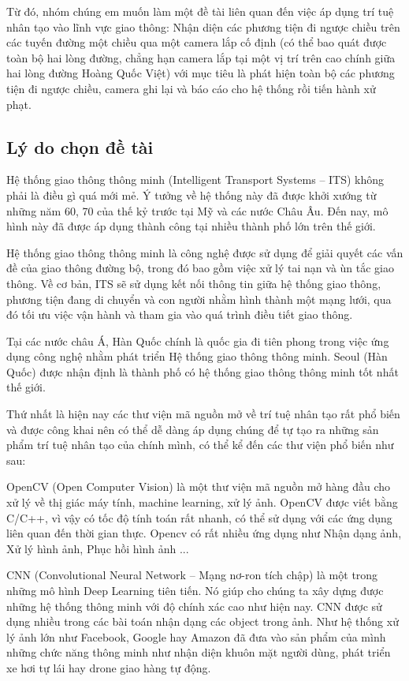 \documentclass[14pt,oneside,a4paper]{extreport}
\begin{document}
Từ đó, nhóm chúng em muốn làm một đề tài liên quan đến việc áp dụng trí tuệ nhân tạo vào lĩnh vực giao thông: Nhận diện các phương tiện đi ngược chiều trên các tuyến đường một chiều qua một camera lắp cố định (có thể bao quát được toàn bộ hai lòng đường, chẳng hạn camera lắp tại một vị trí trên cao chính giữa hai lòng đường Hoàng Quốc Việt) với mục tiêu là phát hiện toàn bộ các phương tiện đi ngược chiều, camera ghi lại và báo cáo cho hệ thống rồi tiến hành xử phạt.

\subsection{Lý do chọn đề tài}
Hệ thống giao thông thông minh (Intelligent Transport Systems – ITS) không phải là điều gì quá mới mẻ. Ý tưởng về hệ thống này đã được khởi xướng từ những năm 60, 70 của thế kỷ trước tại Mỹ và các nước Châu Âu. Đến nay, mô hình này đã được áp dụng thành công tại nhiều thành phố lớn trên thế giới.

Hệ thống giao thông thông minh là công nghệ được sử dụng để giải quyết các vấn đề của giao thông đường bộ, trong đó bao gồm việc xử lý tai nạn và ùn tắc giao thông. Về cơ bản, ITS sẽ sử dụng kết nối thông tin giữa hệ thống giao thông, phương tiện đang di chuyển và con người nhằm hình thành một mạng lưới, qua đó tối ưu việc vận hành và tham gia vào quá trình điều tiết giao thông.

Tại các nước châu Á, Hàn Quốc chính là quốc gia đi tiên phong trong việc ứng dụng công nghệ nhằm phát triển Hệ thống giao thông thông minh. Seoul (Hàn Quốc) được nhận định là thành phố có hệ thống giao thông thông minh tốt nhất thế giới.

Thứ nhất là hiện nay các thư viện mã nguồn mở về trí tuệ nhân tạo rất phổ biến và được công khai nên có thể dễ dàng áp dụng chúng để tự tạo ra những sản phẩm trí tuệ nhân tạo của chính mình, có thể kể đến các thư viện phổ biến như sau:

OpenCV (Open Computer Vision) là một thư viện mã nguồn mở hàng đầu cho xử lý về thị giác máy tính, machine learning, xử lý ảnh. OpenCV được viết bằng C/C++, vì vậy có tốc độ tính toán rất nhanh, có thể sử dụng với các ứng dụng liên quan đến thời gian thực. Opencv có rất nhiều ứng dụng như Nhận dạng ảnh, Xử lý hình ảnh, Phục hồi hình ảnh ...

CNN (Convolutional Neural Network – Mạng nơ-ron tích chập) là một trong những mô hình Deep Learning tiên tiến. Nó giúp cho chúng ta xây dựng được những hệ thống thông minh với độ chính xác cao như hiện nay. CNN được sử dụng nhiều trong các bài toán nhận dạng các object trong ảnh. Như hệ thống xử lý ảnh lớn như Facebook, Google hay Amazon đã đưa vào sản phẩm của mình những chức năng thông minh như nhận diện khuôn mặt người dùng, phát triển xe hơi tự lái hay drone giao hàng tự động.
\end{document}
